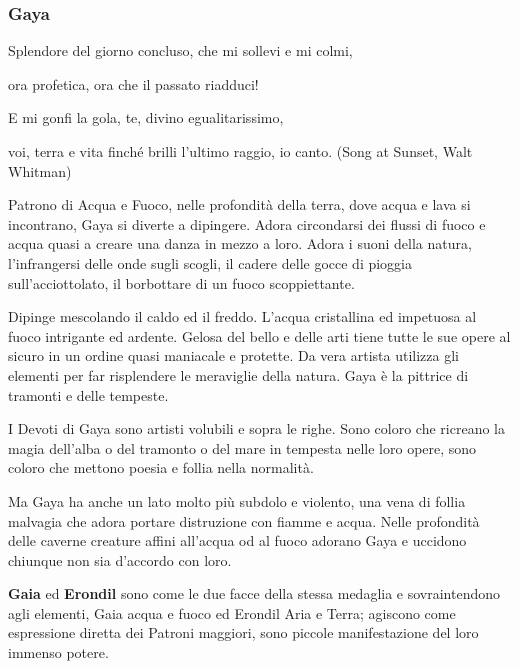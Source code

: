 \begin{multicols}{2}
\subsubsection{Gaya}\label{gaya}\hypertarget{gaya}{}

\begin{changemargin}{0.3cm}{0.3cm}\begin{enfasi}{
{Splendore del giorno concluso, che mi sollevi e mi colmi,

ora profetica, ora che il passato riadduci!

E mi gonfi la gola, te, divino egualitarissimo,

voi, terra e vita finché brilli l'ultimo raggio, io canto. (Song at Sunset, Walt Whitman)}
}\end{enfasi}\end{changemargin}\medskip


Patrono di Acqua e Fuoco, nelle profondità della terra, dove acqua e lava si incontrano, Gaya si diverte a dipingere. Adora circondarsi dei flussi di fuoco e acqua quasi a creare una danza in mezzo a loro. Adora i suoni della natura, l'infrangersi delle onde sugli scogli, il cadere delle gocce di pioggia sull'acciottolato, il borbottare di un fuoco scoppiettante.

Dipinge mescolando il caldo ed il freddo. L'acqua cristallina ed impetuosa al fuoco intrigante ed ardente. Gelosa del bello e delle arti tiene tutte le sue opere al sicuro in un ordine quasi maniacale e protette. Da vera artista utilizza gli elementi per far risplendere le meraviglie della natura. Gaya è la pittrice di tramonti e delle tempeste.

I Devoti di Gaya sono artisti volubili e sopra le righe. Sono coloro che ricreano la magia dell'alba o del tramonto o del mare in tempesta nelle loro opere, sono coloro che mettono poesia e follia nella normalità.

Ma Gaya ha anche un lato molto più subdolo e violento, una vena di follia malvagia che adora portare distruzione con fiamme e acqua. Nelle profondità delle caverne creature affini all'acqua od al fuoco adorano Gaya e uccidono chiunque non sia d'accordo con loro.


\begin{changemargin}{0.3cm}{0.3cm}\begin{narratore}
\textbf{Gaia} ed \textbf{Erondil} sono come le due facce della stessa medaglia e sovraintendono agli elementi, Gaia acqua e fuoco ed Erondil Aria e Terra; agiscono come espressione diretta dei Patroni maggiori, sono piccole manifestazione del loro immenso potere.
\end{narratore}\end{changemargin}



\end{multicols}
